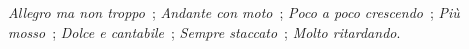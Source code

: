 \emph{Allegro ma non troppo}~; \emph{Andante con moto}~; \emph{Poco a poco crescendo}~; \emph{Più mosso}~; \emph{Dolce e cantabile}~; \emph{Sempre staccato}~; \emph{Molto ritardando}.

